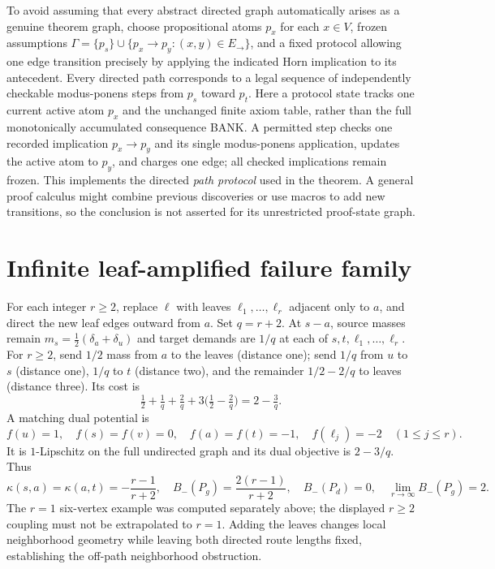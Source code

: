 \begin{remark}
To avoid assuming that every abstract directed graph automatically arises as a genuine theorem graph, choose propositional atoms $p_x$ for each $x\in V$, frozen assumptions $\Gamma=\{p_s\}\cup\{p_x\to p_y:(x,y)\in E_{\to}\}$, and a fixed protocol allowing one edge transition precisely by applying the indicated Horn implication to its antecedent. Every directed path corresponds to a legal sequence of independently checkable modus-ponens steps from $p_s$ toward $p_t$. Here a protocol state tracks one current active atom $p_x$ and the unchanged finite axiom table, rather than the full monotonically accumulated consequence BANK. A permitted step checks one recorded implication $p_x\to p_y$ and its single modus-ponens application, updates the active atom to $p_y$, and charges one edge; all checked implications remain frozen. This implements the directed \emph{path protocol} used in the theorem. A general proof calculus might combine previous discoveries or use macros to add new transitions, so the conclusion is not asserted for its unrestricted proof-state graph.
\end{remark}

\section{Infinite leaf-amplified failure family}
For each integer $r\ge2$, replace $\ell$ with leaves $\ell_1,\dots,\ell_r$ adjacent only to $a$, and direct the new leaf edges outward from $a$. Set $q=r+2$. At $s-a$, source masses remain $m_s=\frac12(\delta_a+\delta_u)$ and target demands are $1/q$ at each of $s,t,\ell_1,\ldots,\ell_r$. For $r\ge2$, send $1/2$ mass from $a$ to the leaves (distance one); send $1/q$ from $u$ to $s$ (distance one), $1/q$ to $t$ (distance two), and the remainder $1/2-2/q$ to leaves (distance three). Its cost is
\[\tfrac12+\tfrac1q+\tfrac2q+3\bigl(\tfrac12-\tfrac2q\bigr)=2-\tfrac3q.\]
A matching dual potential is
\[f(u)=1,\quad f(s)=f(v)=0,\quad f(a)=f(t)=-1,\quad f(\ell_j)=-2\quad(1\le j\le r).\]
It is $1$-Lipschitz on the full undirected graph and its dual objective is $2-3/q$. Thus
\[\kappa(s,a)=\kappa(a,t)=-\frac{r-1}{r+2},\quad B_-(P_g)=\frac{2(r-1)}{r+2},\quad B_-(P_d)=0,\quad \lim_{r\to\infty}B_-(P_g)=2.\]
The $r=1$ six-vertex example was computed separately above; the displayed $r\ge2$ coupling must not be extrapolated to $r=1$. Adding the leaves changes local neighborhood geometry while leaving both directed route lengths fixed, establishing the off-path neighborhood obstruction.

